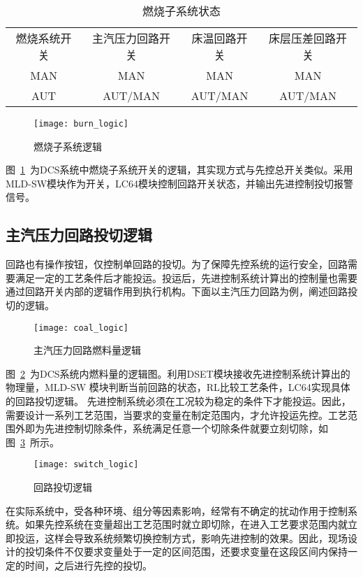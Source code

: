 \begingroup
\renewcommand*{\arraystretch}{1.67}
\begin{table}[!h]
\small
\centering
\caption[燃烧子系统状态]{燃烧子系统状态} \label{tab:burnning_state}
\begin{tabular}{cccc}
\hline\hline
燃烧系统开关&主汽压力回路开关&床温回路开关&床层压差回路开关\\
MAN&MAN&MAN&MAN\\
AUT&AUT/MAN&AUT/MAN&AUT/MAN\\
\hline\hline
\end{tabular}
\end{table}
\endgroup

\begin{figure}[!hbt]
\centering
\texttt{[image: burn\_logic]}
\caption{燃烧子系统逻辑} \label{fig:burn_logic}
\end{figure}
 
图~\ref{fig:burn_logic}~为DCS系统中燃烧子系统开关的逻辑，其实现方式与先控总开关类似。采用MLD-SW模块作为开关，LC64模块控制回路开关状态，并输出先进控制投切报警信号。

\subsection{主汽压力回路投切逻辑}
回路也有操作按钮，仅控制单回路的投切。为了保障先控系统的运行安全，回路需要满足一定的工艺条件后才能投运。投运后，先进控制系统计算出的控制量也需要通过回路开关内部的逻辑作用到执行机构。下面以主汽压力回路为例，阐述回路投切的逻辑。

\begin{figure}[!hbt]
\centering
\texttt{[image: coal\_logic]}
\caption{主汽压力回路燃料量逻辑} \label{fig:coal_logic}
\end{figure}
 
图~\ref{fig:coal_logic}~为DCS系统内燃料量的逻辑图。利用DSET模块接收先进控制系统计算出的物理量，MLD-SW 模块判断当前回路的状态，RL比较工艺条件，LC64实现具体的回路投切逻辑。
先进控制系统必须在工况较为稳定的条件下才能投运。因此，需要设计一系列工艺范围，当要求的变量在制定范围内，才允许投运先控。工艺范围外即为先进控制切除条件，系统满足任意一个切除条件就要立刻切除，如图~\ref{fig:switch_logic}~所示。

\begin{figure}[!hbt]
\centering
\texttt{[image: switch\_logic]}
\caption{回路投切逻辑} \label{fig:switch_logic}
\end{figure}

在实际系统中，受各种环境、组分等因素影响，经常有不确定的扰动作用于控制系统。如果先控系统在变量超出工艺范围时就立即切除，在进入工艺要求范围内就立即投运，这样会导致系统频繁切换控制方式，影响先进控制的效果。因此，现场设计的投切条件不仅要求变量处于一定的区间范围，还要求变量在这段区间内保持一定的时间，之后进行先控的投切。

